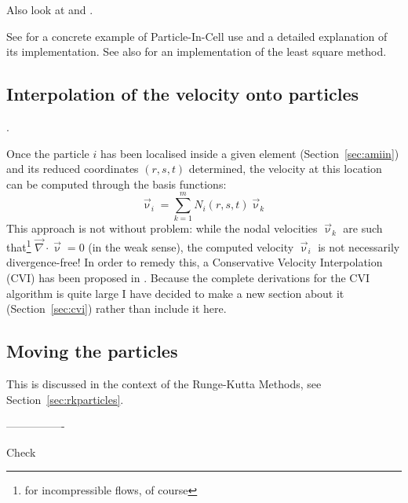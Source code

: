 Also look at \textcite{yamm21} and \textcite{bolc17}.


See  for a concrete example of Particle-In-Cell use and a detailed 
explanation of its implementation. See also  for an implementation of the 
least square method. 



\subsection{Interpolation of the velocity onto particles}.

Once the particle $i$ has been localised inside a given element (Section~\ref{sec:amiin}) 
and its reduced coordinates $(r,s,t)$ determined, the velocity at this location can 
be computed through the basis functions:
\[
\vec\upnu_i=\sum_{k=1}^m N_i(r,s,t) \vec\upnu_k
\]
This approach is not without problem: while the nodal velocities $\vec\upnu_k$ are such 
that\footnote{for incompressible flows, of course} 
$\vec\nabla\cdot\vec\upnu=0$ (in the weak sense), the computed velocity $\vec\upnu_i$ 
is not necessarily divergence-free! In order to remedy this, a 
Conservative Velocity Interpolation (CVI) has been proposed in \cite{waav15}.
Because the complete derivations for the CVI algorithm is quite large I 
have decided to make a new section about it (Section~\ref{sec:cvi}) rather than include it 
here.

\subsection{Moving the particles}

This is discussed in the context of the Runge-Kutta Methods, see Section~\ref{sec:rkparticles}.


----------------

Check 








